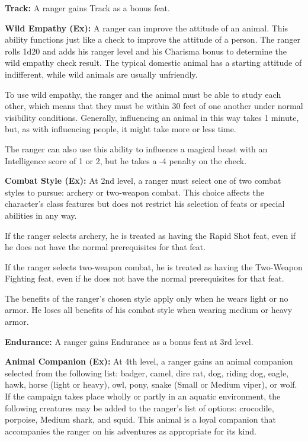 \textbf{Track:} A ranger gains Track as a bonus feat.

\textbf{Wild Empathy (Ex):} A ranger can improve the attitude of an animal. This 
ability functions just like a  check to improve the attitude of a person. 
The ranger rolls 1d20 and adds his ranger level and his Charisma bonus to determine 
the wild empathy check result. The typical domestic animal has a starting attitude 
of indifferent, while wild animals are usually unfriendly.

To use wild empathy, the ranger and the animal must be able to study each other, 
which means that they must be within 30 feet of one another under normal visibility 
conditions. Generally, influencing an animal in this way takes 1 minute, but, as 
with influencing people, it might take more or less time.

The ranger can also use this ability to influence a magical beast with an Intelligence 
score of 1 or 2, but he takes a -4 penalty on the check.

\textbf{Combat Style (Ex):} At 2nd level, a ranger must select one of two combat 
styles to pursue: archery or two-weapon combat. This choice affects the character's 
class features but does not restrict his selection of feats or special abilities 
in any way.

If the ranger selects archery, he is treated as having the Rapid Shot feat, even 
if he does not have the normal prerequisites for that feat.

If the ranger selects two-weapon combat, he is treated as having the Two-Weapon 
Fighting feat, even if he does not have the normal prerequisites for that feat.

The benefits of the ranger's chosen style apply only when he wears light or no 
armor. He loses all benefits of his combat style when wearing medium or heavy armor.

\textbf{Endurance:} A ranger gains Endurance as a bonus feat at 3rd level.

\textbf{Animal Companion (Ex):} At 4th level, a ranger gains an animal companion 
selected from the following list: badger, camel, dire rat, dog, riding dog, eagle, 
hawk, horse (light or heavy), owl, pony, snake (Small or Medium viper), or wolf. 
If the campaign takes place wholly or partly in an aquatic environment, the following 
creatures may be added to the ranger's list of options: crocodile, porpoise, Medium 
shark, and squid. This animal is a loyal companion that accompanies the ranger 
on his adventures as appropriate for its kind.

